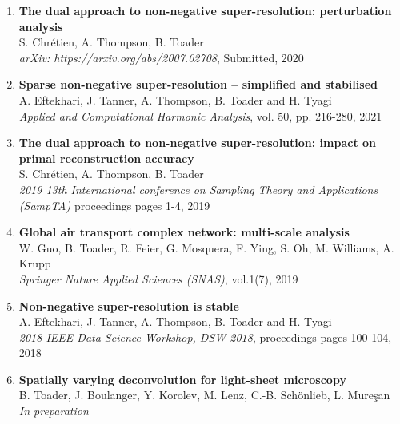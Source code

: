 \documentclass[10pt,a4paper,roman]{moderncv} %
\begin{document}
\begin{enumerate}

  \item
\textbf{The dual approach to non-negative super-resolution: 
  perturbation analysis}\\
S. Chrétien, A. Thompson, B. Toader\\
{\em arXiv: https://arxiv.org/abs/2007.02708},
Submitted, 2020
\vspace{1em}

  \item
\textbf{Sparse non-negative super-resolution -- simplified and stabilised} \\
A. Eftekhari, J. Tanner, A. Thompson, B. Toader and H. Tyagi\\
{\em Applied and Computational Harmonic Analysis},
vol. 50, pp. 216-280, 2021
\vspace{1em}

  \item
\textbf{The dual approach to non-negative super-resolution: 
  impact on primal reconstruction accuracy}\\
S. Chrétien, A. Thompson, B. Toader\\
{\em 2019 13th International conference on Sampling Theory 
  and Applications (SampTA)} 
proceedings pages 1-4, 2019
\vspace{1em}

  \item
\textbf{Global air transport complex network: multi-scale analysis}\\
W. Guo, B. Toader, R. Feier, G. Mosquera, F. Ying, S. Oh, M. Williams, A. Krupp\\
{\em Springer Nature Applied Sciences (SNAS)}, vol.1(7), 2019 
\vspace{1em}

  \item
\textbf{Non-negative super-resolution is stable} \\
A. Eftekhari, J. Tanner, A. Thompson, B. Toader and H. Tyagi\\
{\em 2018 IEEE Data Science Workshop, DSW 2018}, 
proceedings pages 100-104, 2018
\vspace{1em}
  
\item 
\textbf{Spatially varying deconvolution for light-sheet microscopy}\\
B. Toader, J. Boulanger, Y. Korolev, M. Lenz, C.-B. Schönlieb, L. Mureşan\\
{\em In preparation}
\vspace{1em}



\end{enumerate}
\end{document}
